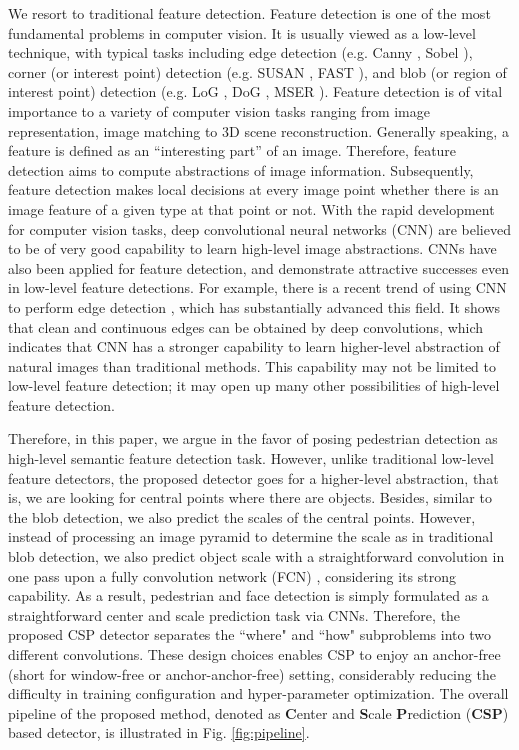 \documentclass[review]{elsarticle}
\begin{document}
We resort to traditional feature detection. Feature detection is one of the most fundamental problems in computer vision. It is usually viewed as a low-level technique, with typical tasks including edge detection (e.g. Canny \cite{canny1986computational}, Sobel \cite{sobel1972camera}), corner (or interest point) detection (e.g. SUSAN \cite{smith1997susan}, FAST \cite{rosten2006machine}), and blob (or region of interest point) detection (e.g. LoG \cite{lindeberg2013scale}, DoG \cite{lowe2004distinctive}, MSER \cite{matas2004robust}). Feature detection is of vital importance to a variety of computer vision tasks ranging from image representation, image matching to 3D scene reconstruction. Generally speaking, a feature is defined as an ``interesting part'' of an image. Therefore, feature detection aims to compute abstractions of image information. Subsequently,  feature detection makes local decisions at every image point whether there is an image feature of a given type at that point or not. With the rapid development for computer vision tasks, deep convolutional neural networks (CNN) are believed to be of very good capability to learn high-level image abstractions. CNNs have also been applied for feature detection, and demonstrate attractive successes even in low-level feature detections. For example, there is a recent trend of using CNN to perform edge detection \cite{shen2015deepcontour,xie2017holistically,bertasius2015deepedge,liu2017richer}, which has substantially advanced this field. It shows that clean and continuous edges can be obtained by deep convolutions, which indicates that CNN has a stronger capability to learn higher-level abstraction of natural images than traditional methods. This capability may not be limited to low-level feature detection; it may open up many other possibilities of high-level feature detection.

Therefore, in this paper, we argue in the favor of posing pedestrian detection as high-level semantic feature detection task. However, unlike traditional low-level feature detectors, the proposed detector goes for a higher-level abstraction, that is, we are looking for central points where there are objects. Besides, similar to the blob detection, we also predict the scales of the central points. However, instead of processing an image pyramid to determine the scale as in traditional blob detection, we also predict object scale with a straightforward convolution in one pass upon a fully convolution network (FCN) \cite{long2015fully}, considering its strong capability. As a result, pedestrian and face detection is simply formulated as a straightforward center and scale prediction task via CNNs. Therefore, the proposed CSP detector separates the ``where" and ``how" subproblems into two different convolutions. These design choices enables CSP to enjoy an anchor-free (short for window-free or anchor-anchor-free) setting, considerably reducing the difficulty in training configuration and hyper-parameter optimization. The overall pipeline of the proposed method, denoted as \textbf{C}enter and \textbf{S}cale \textbf{P}rediction (\textbf{CSP}) based detector, is illustrated in Fig. \ref{fig:pipeline}.
\end{document}
